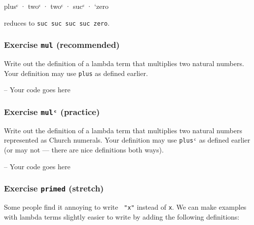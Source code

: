 \begin{myDisplay}
plusᶜ · twoᶜ · twoᶜ · sucᶜ · `zero
\end{myDisplay}

reduces to
\texttt{\textasciigrave{}suc\ \textasciigrave{}suc\ \textasciigrave{}suc\ \textasciigrave{}suc\ \textasciigrave{}zero}.

\hypertarget{exercise-mul-recommended}{%
\subsubsection{\texorpdfstring{Exercise \texttt{mul}
(recommended)}{Exercise mul (recommended)}}\label{exercise-mul-recommended}}

Write out the definition of a lambda term that multiplies two natural
numbers. Your definition may use \texttt{plus} as defined earlier.

\begin{fence}
\begin{code}
-- Your code goes here
\end{code}
\end{fence}

\hypertarget{exercise-mulux1d9c-practice}{%
\subsubsection{\texorpdfstring{Exercise \texttt{mulᶜ}
(practice)}{Exercise mulᶜ (practice)}}\label{exercise-mulux1d9c-practice}}

Write out the definition of a lambda term that multiplies two natural
numbers represented as Church numerals. Your definition may use
\texttt{plusᶜ} as defined earlier (or may not --- there are nice
definitions both ways).

\begin{fence}
\begin{code}
-- Your code goes here
\end{code}
\end{fence}

\hypertarget{Lambda-primed}{%
\subsubsection{\texorpdfstring{Exercise \texttt{primed}
(stretch)}{Exercise primed (stretch)}}\label{Lambda-primed}}

Some people find it annoying to write \texttt{\textasciigrave{}\ "x"}
instead of \texttt{x}. We can make examples with lambda terms slightly
easier to write by adding the following definitions:

